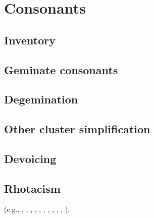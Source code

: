 \chapter{Consonants}
\label{consonants}

\section{Inventory}

\citet{Allen1978}

\citet{Steriade1995}

\section{Geminate consonants}


\section{Degemination}


\section{Other cluster simplification}

\citet{Heslin1987}

\section{Devoicing}

\citet{Allen1978}

\section{Rhotacism}

\citet{Saussure1877}


(e.g., \citealt{Albright2005}, \citealt[62]{Foley1965}, \citealt{Gruber2006}, \citealt[134]{Heslin1987}, \citealt[377]{Kenstowicz1996}, \citealt{KiparskyInPress}, \citealt[314]{Klausenburger1976}, \citealt[19]{Matthews1972a}, \citealt{Roberts2012}, \citealt{Touratier1975}, \citealt{Watkins1970}).

